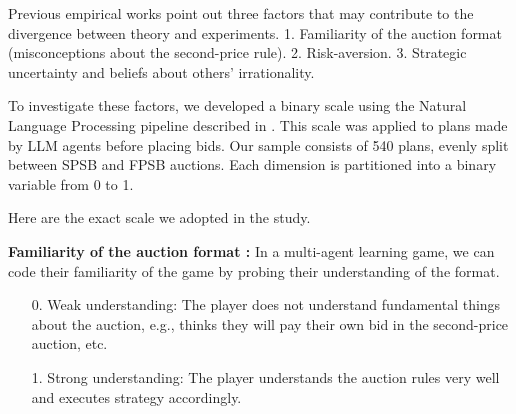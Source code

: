 \documentclass{article} %
\begin{document}


Previous empirical works point out three factors that may contribute to the divergence between theory and experiments.
1. Familiarity of the auction format (misconceptions about the second-price rule).
2. Risk-aversion. 
3. Strategic uncertainty and beliefs about others' irrationality.


To investigate these factors, we developed a binary scale using the Natural Language Processing pipeline described in \cite{Horton2024EDSL}. 
This scale was applied to plans made by LLM agents before placing bids. 
Our sample consists of 540 plans, evenly split between SPSB and FPSB auctions. 
Each dimension is partitioned into a binary variable from 0 to 1.

Here are the exact scale we adopted in the study.

\textbf{Familiarity of the auction format :}
In a multi-agent learning game, we can code their familiarity of the game by probing their understanding of the format.

\begin{enumerate}
    \item[0.] Weak understanding: The player does not understand fundamental things about the auction, e.g., thinks they will pay their own bid in the second-price auction, etc.
    \item[1.]  Strong understanding: The player understands the auction rules very well and executes strategy accordingly.
\end{enumerate}


\end{document}
